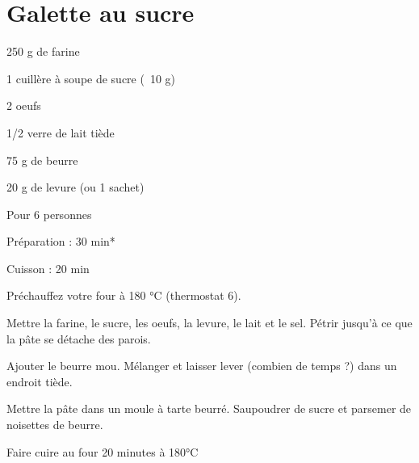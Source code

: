\section{Galette au sucre}

\begin{ingredients}
\item 250 g de farine
\item 1 cuillère à soupe de sucre (~10 g)
\item 2 oeufs
\item 1/2 verre de lait tiède
\item 75 g de beurre
\item 20 g de levure (ou 1 sachet)
\end{ingredients}
\begin{infos}
\item Pour 6 personnes		%
\item Préparation : 30 min*		%
\item Cuisson : 20 min			%
\end{infos}
\begin{etapes}
\item Préchauffez votre four à 180 °C (thermostat 6).  
\item Mettre la farine, le sucre, les oeufs, la levure, le lait et le sel. Pétrir jusqu'à ce que la pâte se détache des parois.
\item Ajouter le beurre mou. Mélanger et laisser lever (combien de temps ?) dans un endroit tiède.
\item Mettre la pâte dans un moule à tarte beurré. Saupoudrer de sucre et parsemer de noisettes de beurre.
\item Faire cuire au four 20 minutes à 180°C
\end{etapes}
\begin{conseils}
\end{conseils}
